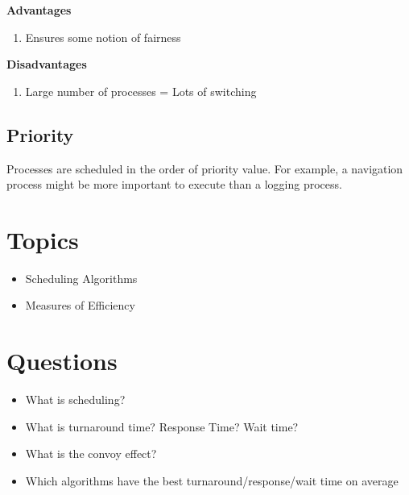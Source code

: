 \textbf{Advantages} 

\begin{enumerate}
  \item Ensures some notion of fairness
\end{enumerate}

\textbf{Disadvantages} 

\begin{enumerate}
  \item Large number of processes = Lots of switching
\end{enumerate}

\subsection{Priority}

Processes are scheduled in the order of priority value. For example, a navigation process might be more important to execute than a logging process.

\section{Topics}

\begin{itemize}
\tightlist
\item
  Scheduling Algorithms
\item
  Measures of Efficiency
\end{itemize}

\section{Questions}

\begin{itemize}
\tightlist
\item
  What is scheduling?
\item
  What is turnaround time? Response Time? Wait time?
\item
  What is the convoy effect?
\item
  Which algorithms have the best turnaround/response/wait time on average
\end{itemize}



